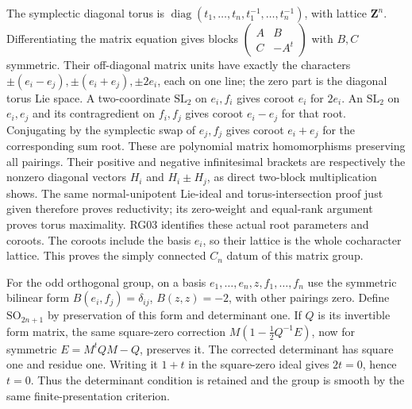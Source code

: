 \documentclass[11pt,a4paper,openany]{report}
\begin{document}
The symplectic diagonal torus is \(\operatorname{diag}(t_1,\ldots,t_n,t_1^{-1},\ldots,t_n^{-1})\), with lattice \(\mathbf Z^n\). Differentiating the matrix equation gives blocks \(\left(\begin{smallmatrix}A&B\\C&-A^t\end{smallmatrix}\right)\) with \(B,C\) symmetric. Their off-diagonal matrix units have exactly the characters \(\pm(e_i-e_j),\pm(e_i+e_j),\pm2e_i\), each on one line; the zero part is the diagonal torus Lie space. A two-coordinate \(\mathrm{SL}_2\) on \(e_i,f_i\) gives coroot \(e_i\) for \(2e_i\). An \(\mathrm{SL}_2\) on \(e_i,e_j\) and its contragredient on \(f_i,f_j\) gives coroot \(e_i-e_j\) for that root. Conjugating by the symplectic swap of \(e_j,f_j\) gives coroot \(e_i+e_j\) for the corresponding sum root. These are polynomial matrix homomorphisms preserving all pairings. Their positive and negative infinitesimal brackets are respectively the nonzero diagonal vectors \(H_i\) and \(H_i\pm H_j\), as direct two-block multiplication shows. The same normal-unipotent Lie-ideal and torus-intersection proof just given therefore proves reductivity; its zero-weight and equal-rank argument proves torus maximality. RG03 identifies these actual root parameters and coroots. The coroots include the basis \(e_i\), so their lattice is the whole cocharacter lattice. This proves the simply connected \(C_n\) datum of this matrix group.

For the odd orthogonal group, on a basis \(e_1,\ldots,e_n,z,f_1,\ldots,f_n\) use the symmetric bilinear form \(B(e_i,f_j)=\delta_{ij}\), \(B(z,z)=-2\), with other pairings zero. Define \(\mathrm{SO}_{2n+1}\) by preservation of this form and determinant one. If \(Q\) is its invertible form matrix, the same square-zero correction \(M(1-\tfrac12Q^{-1}E)\), now for symmetric \(E=M^tQM-Q\), preserves it. The corrected determinant has square one and residue one. Writing it \(1+t\) in the square-zero ideal gives \(2t=0\), hence \(t=0\). Thus the determinant condition is retained and the group is smooth by the same finite-presentation criterion.
\end{document}
